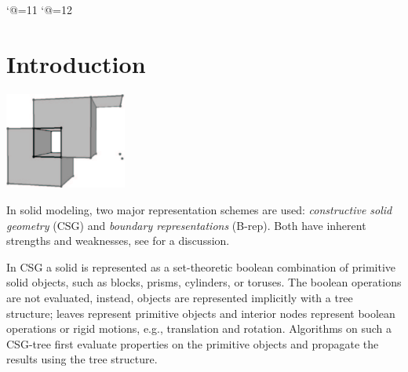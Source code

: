 
\ccParDims




\begin{lcTexBlock}
  \catcode`@=11
  \gdef\pyr{\mathop{\operator@font Pyr}\nolimits}
  \gdef\aff{\mathop{\operator@font aff}\nolimits}
  \catcode`@=12
\end{lcTexBlock}
\lcHtml{
  \newcommand{\pyr}{Pyr}
  \newcommand{\aff}{aff}
}

\minitoc

\section{Introduction}

\begin{ccTexOnly}
    \vspace*{-20mm}
    \begin{flushright}
      \parbox{0.3\textwidth}{%
          \includegraphics[width=0.3\textwidth]{Nef_3/fig/nef_non_manifold3a}%
      }%
    \end{flushright}
\end{ccTexOnly}

In solid modeling, two major representation schemes are used:
\emph{constructive solid geometry} (CSG) and \emph{boundary
  representations} (B-rep). Both have inherent strengths and
weaknesses, see \cite{cgal:h-gsmi-89} for a discussion.

In CSG a solid is represented as a set-theoretic boolean combination
of primitive solid objects, such as blocks, prisms, cylinders, or
toruses.  The boolean operations are not evaluated, instead, objects
are represented implicitly with a tree structure; leaves represent
primitive objects and interior nodes represent boolean operations or
rigid motions, e.g., translation and rotation. Algorithms on such a
CSG-tree first evaluate properties on the primitive objects and
propagate the results using the tree structure.
 
